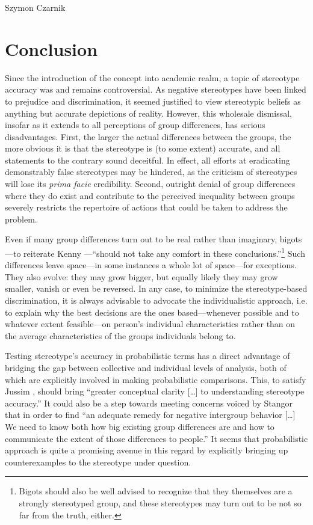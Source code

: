 \begin{artengenv}{Szymon Czarnik}
\section{Conclusion}
Since the introduction of the concept into academic realm, a topic of stereotype accuracy was and remains controversial. As negative stereotypes have been linked to prejudice and discrimination, it seemed justified to view stereotypic beliefs as anything but accurate depictions of reality. However, this wholesale dismissal, insofar as it extends to all perceptions of group differences, has serious disadvantages. First, the larger the actual differences between the groups, the more obvious it is that the stereotype is (to some extent) accurate, and all statements to the contrary sound deceitful. In effect, all efforts at eradicating demonstrably false stereotypes may be hindered, as the criticism of stereotypes will lose its \textit{prima facie} credibility. Second, outright denial of group differences where they do exist and contribute to the perceived inequality between groups severely restricts the repertoire of actions that could be taken to address the problem.

Even if many group differences turn out to be real rather than imaginary, bigots—to reiterate Kenny
\parencite*[][p.212]{kenny_interpersonal_1994}%
—``should not take any comfort in these conclusions.''\footnote{Bigots should also be well advised to recognize that they themselves are a strongly stereotyped group, and these stereotypes may turn out to be not so far from the truth, either. } Such differences leave space—in some instances a whole lot of space—for exceptions. They also evolve: they may grow bigger, but equally likely they may grow smaller, vanish or even be reversed. In any case, to minimize the stereotype-based discrimination, it is always advisable to advocate the individualistic approach, i.e. to explain why the best decisions are the ones based—whenever possible and to whatever extent feasible—on person's individual characteristics rather than on the average characteristics of the groups individuals belong to.

Testing stereotype's accuracy in probabilistic terms has a direct advantage of bridging the gap between collective and individual levels of analysis, both of which are explicitly involved in making probabilistic comparisons. This, to satisfy Jussim
\parencite*[][p.309]{jussim_social_2012}, %
 should bring ``greater conceptual clarity […] to understanding stereotype accuracy.'' It could also be a step towards meeting concerns voiced by Stangor 
\parencite*[][p.278]{lee_content_1995} %
 that in order to find ``an adequate remedy for negative intergroup behavior […] We need to know both how big existing group differences are and how to communicate the extent of those differences to people.'' It seems that probabilistic approach is quite a promising avenue in this regard by explicitly bringing up counterexamples to the stereotype under question.


\end{artengenv}
